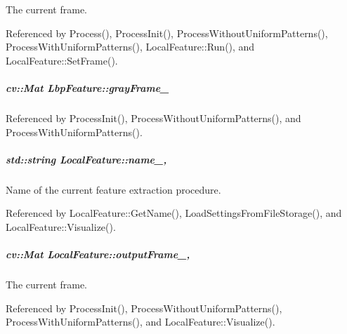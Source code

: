 The current frame. 



Referenced by Process(), Process\-Init(), Process\-Without\-Uniform\-Patterns(), Process\-With\-Uniform\-Patterns(), Local\-Feature\-::\-Run(), and Local\-Feature\-::\-Set\-Frame().

\hypertarget{group___feature_extractor_ab2bdc329e16e4126eccbbe4b8d4d44f5}{
\subparagraph[{gray\-Frame\-\_\-}]{\setlength{\rightskip}{0pt plus 5cm}cv\-::\-Mat Lbp\-Feature\-::gray\-Frame\-\_\-\hspace{0.3cm}{\ttfamily [private]}}}\label{group___feature_extractor_ab2bdc329e16e4126eccbbe4b8d4d44f5}


Referenced by Process\-Init(), Process\-Without\-Uniform\-Patterns(), and Process\-With\-Uniform\-Patterns().

\hypertarget{group___feature_extractor_a0e73ef0aed82c04f06b6eeb9a9b9be8b}{
\subparagraph[{name\-\_\-}]{\setlength{\rightskip}{0pt plus 5cm}std\-::string Local\-Feature\-::name\-\_\-\hspace{0.3cm}{\ttfamily [protected]}, {\ttfamily [inherited]}}}\label{group___feature_extractor_a0e73ef0aed82c04f06b6eeb9a9b9be8b}


Name of the current feature extraction procedure. 



Referenced by Local\-Feature\-::\-Get\-Name(), Load\-Settings\-From\-File\-Storage(), and Local\-Feature\-::\-Visualize().

\hypertarget{group___feature_extractor_a1c7b8087feb05f02b09eb1b536d443e6}{
\subparagraph[{output\-Frame\-\_\-}]{\setlength{\rightskip}{0pt plus 5cm}cv\-::\-Mat Local\-Feature\-::output\-Frame\-\_\-\hspace{0.3cm}{\ttfamily [protected]}, {\ttfamily [inherited]}}}\label{group___feature_extractor_a1c7b8087feb05f02b09eb1b536d443e6}


The current frame. 



Referenced by Process\-Init(), Process\-Without\-Uniform\-Patterns(), Process\-With\-Uniform\-Patterns(), and Local\-Feature\-::\-Visualize().

